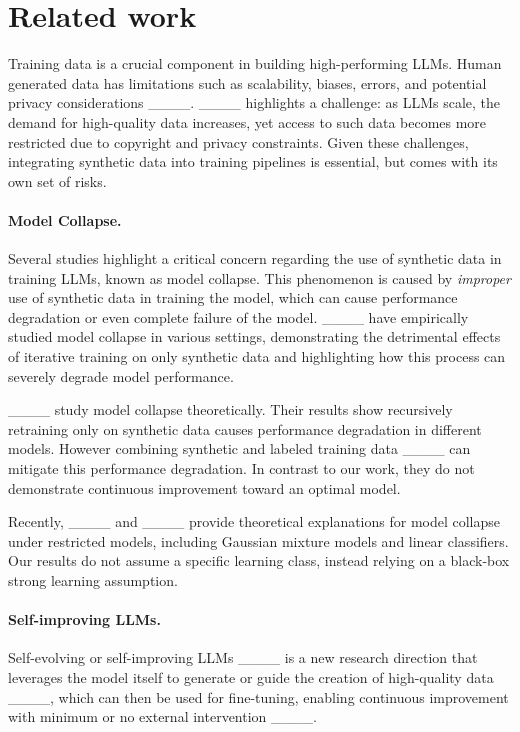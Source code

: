 \section{Related work}
Training data is a crucial component in building high-performing LLMs. %
Human generated data has limitations such as scalability, biases, errors, and potential privacy considerations  ____. ____ highlights a challenge: as LLMs scale, the demand for high-quality data increases, yet access to such data becomes more restricted due to copyright and privacy constraints. Given these challenges, integrating synthetic data into training pipelines is essential, but comes with its own set of risks. %

\paragraph{Model Collapse.} Several studies highlight a critical concern regarding the use of synthetic data in training LLMs, known as model collapse. This phenomenon is caused by \textit{improper} use of synthetic data in training the model, which can cause performance degradation or even complete failure of the model. ____ have empirically studied model collapse in various settings, demonstrating the detrimental effects of iterative training on only synthetic data and highlighting how this process can severely degrade model performance.

____ study model collapse theoretically. Their results show recursively retraining only on synthetic data causes performance degradation in different models. However combining synthetic and labeled training data ____ can mitigate this performance degradation. In contrast to our work, they do not demonstrate continuous improvement toward an optimal model.  

Recently, ____ and ____ provide theoretical explanations for model collapse under restricted models, including Gaussian mixture models and linear classifiers. Our results do not assume a specific learning class, instead relying on a black-box strong learning assumption. 


\paragraph{Self-improving LLMs.} Self-evolving or self-improving LLMs ____ is a new research direction that leverages the model itself to generate or guide the creation of high-quality data ____, which can then be used for fine-tuning, enabling continuous improvement with minimum or no external intervention ____.

